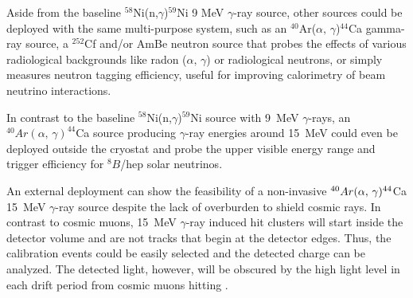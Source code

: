 Aside from the baseline $^{58}$Ni(n,$\gamma$)$^{59}$Ni 9 MeV $\gamma$-ray source, other sources could be deployed with the same multi-purpose system, such as an $^{40}$Ar($\alpha,\,\gamma$)$^{44}$Ca gamma-ray source, a $^{252}$Cf and/or AmBe neutron source that probes the effects of various radiological backgrounds like radon ($\alpha,\,\gamma$) or radiological neutrons, or simply measures neutron tagging efficiency, useful for improving calorimetry of beam neutrino interactions. 

In contrast to the baseline $^{58}$Ni(n,$\gamma$)$^{59}$Ni source with 9~MeV $\gamma$-rays, an $^{40}Ar(\alpha,\,\gamma)^{44}$Ca source producing $\gamma$-ray energies around 15~MeV could even be deployed outside the cryostat and probe the upper visible energy range and trigger efficiency for $^{8}B$/hep solar neutrinos. 


An external  deployment can show the feasibility of a non-invasive $^{40}Ar(\alpha,\,\-\gamma)^{44}$Ca 15~MeV $\gamma$-ray source despite the lack of overburden to shield cosmic rays. In contrast to cosmic muons, 15~MeV $\gamma$-ray induced hit clusters will start inside the detector volume and are not tracks that begin at the detector edges. Thus, the  calibration events could be easily selected and the detected charge can be analyzed. The detected light, however, will be obscured by the high light level in each drift period from cosmic muons hitting . 


